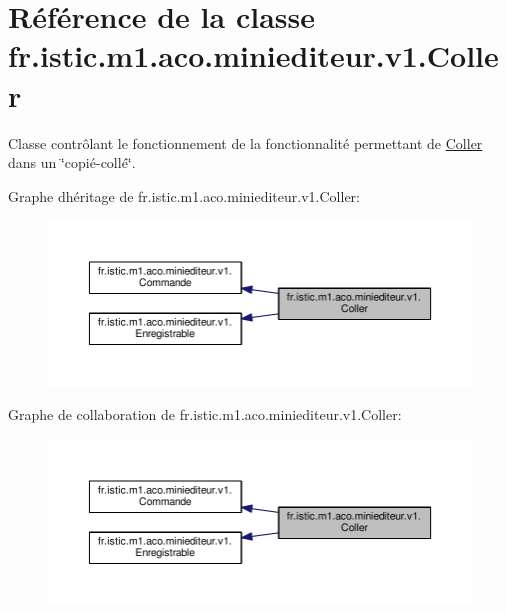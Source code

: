 \hypertarget{classfr_1_1istic_1_1m1_1_1aco_1_1miniediteur_1_1v1_1_1Coller}{}\section{Référence de la classe fr.\+istic.\+m1.\+aco.\+miniediteur.\+v1.\+Coller}
\label{classfr_1_1istic_1_1m1_1_1aco_1_1miniediteur_1_1v1_1_1Coller}


Classe contrôlant le fonctionnement de la fonctionnalité permettant de \hyperlink{classfr_1_1istic_1_1m1_1_1aco_1_1miniediteur_1_1v1_1_1Coller}{Coller} dans un \char`\"{}copié-\/collé\char`\"{}.  




Graphe d\textquotesingle{}héritage de fr.\+istic.\+m1.\+aco.\+miniediteur.\+v1.\+Coller\+:
\nopagebreak
\begin{figure}[H]
\begin{center}
\leavevmode
\includegraphics[width=350pt]{classfr_1_1istic_1_1m1_1_1aco_1_1miniediteur_1_1v1_1_1Coller__inherit__graph}
\end{center}
\end{figure}


Graphe de collaboration de fr.\+istic.\+m1.\+aco.\+miniediteur.\+v1.\+Coller\+:
\nopagebreak
\begin{figure}[H]
\begin{center}
\leavevmode
\includegraphics[width=350pt]{classfr_1_1istic_1_1m1_1_1aco_1_1miniediteur_1_1v1_1_1Coller__coll__graph}
\end{center}
\end{figure}
